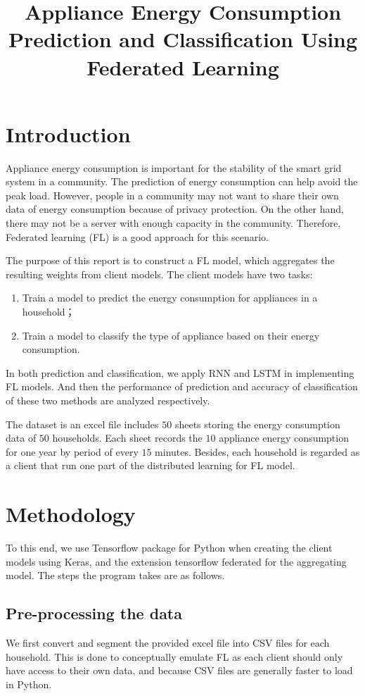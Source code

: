 \documentclass[a4paper, article, oneside, USenglish, IN5460]{memoir}
\title{Appliance Energy Consumption Prediction and Classification Using Federated Learning}
\begin{document}
\projectfrontpage


\chapter{Introduction}
Appliance energy consumption is important for the stability of the smart grid system in a community. The prediction of energy consumption can help avoid the peak load. However, people in a community may not want to share their own data of energy consumption because of privacy protection. On the other hand, there may not be a server with enough capacity in the community. Therefore, Federated learning (FL) is a good approach for this scenario.

The purpose of this report is to construct a FL model, which aggregates the resulting weights from client models. The client models have two tasks:
\begin{enumerate}
    \item Train a model to predict the energy consumption for appliances in a household；
    \item Train a model to classify the type of appliance based on their energy consumption.    
\end{enumerate}

In both prediction and classification, we apply RNN and LSTM in implementing FL models. And then the performance of prediction and accuracy of classification of these two methods are analyzed respectively.

The dataset is an excel file includes $50$ sheets storing the energy consumption data of $50$ households. Each sheet records the $10$ appliance energy consumption for one year by period of every $15$ minutes. Besides, each household is regarded as a client that run one part of the distributed learning for FL model.


\chapter{Methodology}
To this end, we use Tensorflow package for Python when creating the client models using Keras, and the extension tensorflow federated for the aggregating model. The steps the program takes are as follows. 

\section{Pre-processing the data}
We first convert and segment the provided excel file into CSV files for each household. This is done to conceptually emulate FL as each client should only have access to their own data, and because CSV files are generally faster to load in Python.
\end{document}
